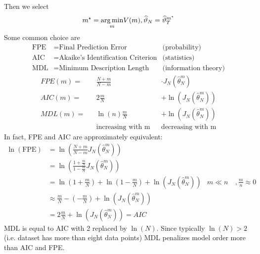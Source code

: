 Then we select
\begin{equation*}
m^{\star} =\underset{m}{\operatorname*{arg\,min}} V(m) ,\widehat{\vartheta }_{N} =\widehat{\vartheta }_{T}^{m^{\star}}
\end{equation*}
Some common choice are
\begin{align*}
\text{FPE} & =\text{Final Prediction Error} & \text{(probability)}\\
\text{AIC} & =\text{Akaike's Identification Criterion} & \text{(statistics)}\\
\text{MDL} & =\text{Minimum Description Length} & \text{(information theory)}
\end{align*}
\begin{equation*}
 \begin{aligned}
FPE(m) = & & \frac{N+m}{N-m}  & & \cdotp J_{N}\left(\hat{\theta }_{N}^{m}\right)\\
AIC(m) = & & 2\frac{m}{N}  & & +\ln\left(J_{N}\left(\hat{\theta }_{N}^{m}\right)\right)\\
MDL(m) = & & \ln(n)\frac{m}{N} & & +\ln\left(J_{N}\left(\hat{\theta }_{N}^{m}\right)\right)\\
 & & \text{increasing with m} & & \text{decreasing with m}
\end{aligned}
\end{equation*}
In fact, FPE and AIC are approximately equivalent:
\begin{equation*}
\begin{aligned}
\ln(\text{FPE}) & =\ln\left(\frac{N+m}{N-m} J_{N}\left(\hat{\theta }_{N}^{m}\right)\right) &  & \\
 & =\ln\left(\frac{1+\frac{m}{N}}{1-\frac{m}{N}} J_{N}\left(\hat{\theta }_{N}^{m}\right)\right) &  & \\
 & =\ln\left(1+\frac{m}{N}\right) +\ln\left(1-\frac{m}{N}\right) +\ln\left(J_{N}\left(\hat{\theta }_{N}^{m}\right)\right) & m\ll n & \ , \frac{m}{n} \approx 0\\
 & \approx \frac{m}{N} -\left(-\frac{m}{N}\right) +\ln\left(J_{N}\left(\hat{\theta }_{N}^{m}\right)\right) &  & \\
 & =2\frac{m}{N} +\ln\left(J_{N}\left(\hat{\theta }_{N}^{m}\right)\right) =AIC &  & 
\end{aligned}
\end{equation*}
MDL is equal to AIC with 2 replaced by $ \ln(N)$. Since typically $ \ln(N)  >2$ (i.e. dataset has more than eight data points) MDL penalizes model order more than AIC and FPE.